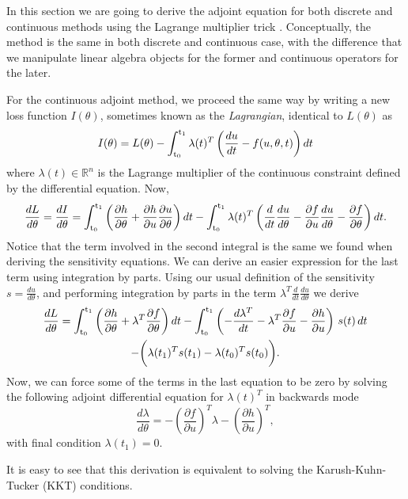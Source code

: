 \label{appendix:lagrangian}


In this section we are going to derive the adjoint equation for both discrete and continuous methods using the Lagrange multiplier trick \cite{Vadlamani_Xiao_Yablonovitch_2020}. 
Conceptually, the method is the same in both discrete and continuous case, with the difference that we manipulate linear algebra objects for the former and continuous operators for the later. 

For the continuous adjoint method, we proceed the same way by writing a new loss function $I(\theta)$, sometimes known as the \textit{Lagrangian}, identical to $L(\theta)$ as 
\begin{equation}
    I(\theta) = L(\theta) - \operatorname{\int_{t_0}^{t_1}} \lambda(t)^T \left( \frac{du}{dt} - f(u, \theta, t) \right) dt
\end{equation}
where $\lambda(t) \in \mathbb R^n$ is the Lagrange multiplier of the continuous constraint defined by the differential equation. Now, 
\begin{equation}
    \frac{dL}{d\theta} = \frac{dI}{d\theta} = 
    \operatorname{\int_{t_0}^{t_1}} \left( \frac{\partial h}{\partial \theta} + \frac{\partial h}{\partial u} \frac{\partial u}{\partial \theta} \right) dt
    - 
    \operatorname{\int_{t_0}^{t_1}} \lambda(t)^T \left( \frac{d}{dt} \frac{du}{d\theta} - \frac{\partial f}{\partial u} \frac{du}{d\theta} - \frac{\partial f}{\partial \theta} \right) dt.
\end{equation}
Notice that the term involved in the second integral is the same we found when deriving the sensitivity equations. 
We can derive an easier expression for the last term using integration by parts. 
Using our usual definition of the sensitivity $s = \frac{du}{d\theta}$, and performing integration by parts in the term $\lambda^T \frac{d}{dt} \frac{du}{d\theta}$ we derive 
\begin{multline}
    \frac{dL}{d\theta}
    = 
    \operatorname{\int_{t_0}^{t_1}} \left( \frac{\partial h}{\partial \theta} + \lambda^T \frac{\partial f}{\partial \theta} \right) dt 
    - 
    \operatorname{\int_{t_0}^{t_1}} \left( - \frac{d\lambda^T}{dt} - \lambda^T \frac{\partial f}{\partial u} - \frac{\partial h}{\partial u} \right) \, s(t) \, dt \\
    -
    \bigg ( \lambda(t_1)^T s(t_1) - \lambda(t_0)^T s(t_0) \bigg ).
    \label{eq:continous-adjoint-loss}
\end{multline}
Now, we can force some of the terms in the last equation to be zero by solving the following adjoint differential equation for $\lambda(t)^T$ in backwards mode
\begin{equation}
    \frac{d\lambda}{d\theta} = - \left(\frac{\partial f}{\partial u}\right)^T \lambda - \left( \frac{\partial h}{\partial u} \right)^T,
    \label{eq:continuous-adjoint}
\end{equation}
with final condition $\lambda(t_1) = 0$. 

It is easy to see that this derivation is equivalent to solving the Karush-Kuhn-Tucker (KKT) conditions. 